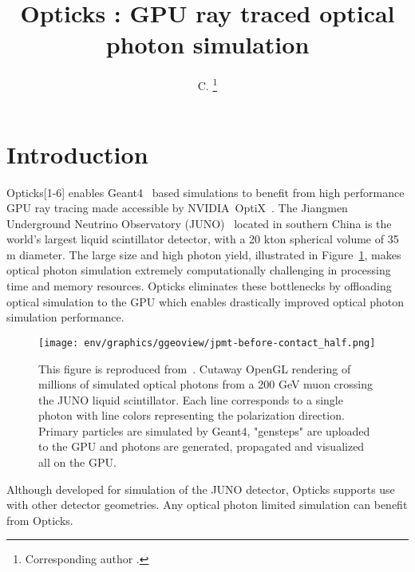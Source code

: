 \documentclass{webofc}
\begin{document}
\title{Opticks : GPU ray traced optical photon simulation}
\author{ C. \fnsep\thanks{Corresponding author .}}
\abstract{}
\maketitle
%
\section{Introduction}%
\label{intro}
%
Opticks[1-6] enables Geant4~\cite{g4} based simulations 
to benefit from high performance GPU ray tracing made accessible 
by NVIDIA\textregistered\ OptiX\texttrademark~\cite{optix}.
%
The Jiangmen Underground Neutrino Observatory (JUNO)~\cite{juno} 
located in southern China is the world's largest liquid scintillator detector, 
with a 20 kton spherical volume of 35 m diameter. The large size and high photon yield, illustrated in Figure~\ref{problem}, 
makes optical photon simulation extremely computationally challenging in processing time and memory resources. 
Opticks eliminates these bottlenecks by offloading optical simulation to the GPU which
enables drastically improved optical photon simulation performance.
%
\begin{figure}
\centering
\texttt{[image: env/graphics/ggeoview/jpmt-before-contact\_half.png]}
\caption{
This figure is reproduced from~\cite{chep2019}. Cutaway OpenGL rendering of millions of simulated optical photons from a 200 GeV muon crossing the JUNO liquid scintillator. 
Each line corresponds to a single photon with line colors representing the polarization direction. 
Primary particles are simulated by Geant4, "gensteps" are uploaded to the GPU and photons are generated, propagated
and visualized all on the GPU. 
}
\label{problem}
\vspace{-5mm}
\end{figure}%
%
%
Although developed for simulation of the JUNO detector, Opticks
supports use with other detector geometries. 
Any optical photon limited simulation can benefit from Opticks.
\end{document}
